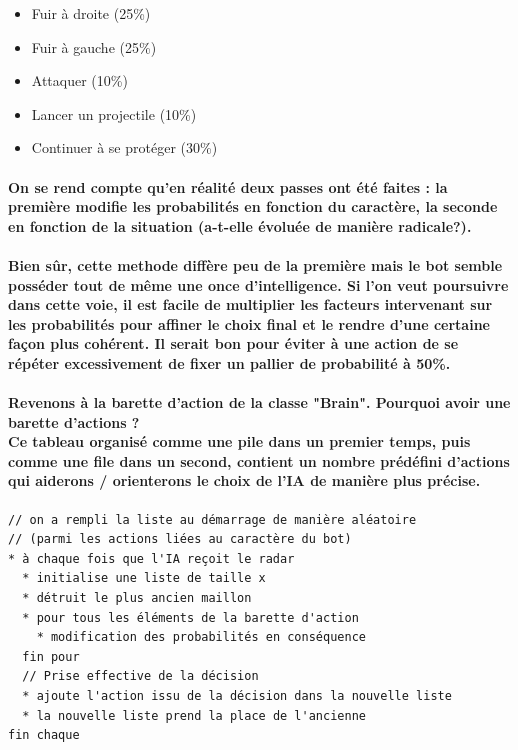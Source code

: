 \begin{itemize}
	\item Fuir à droite (25\%)
	\item Fuir à gauche (25\%)
	\item Attaquer (10\%)
	\item Lancer un projectile (10\%)
	\item Continuer à se protéger (30\%)
\end{itemize}


\paragraph{On se rend compte qu'en réalité deux passes ont été faites : la première modifie les probabilités en fonction du caractère, la seconde en fonction de la situation (a-t-elle évoluée de manière radicale?).}

\paragraph{Bien sûr, cette methode diffère peu de la première mais le bot semble posséder tout de même une once d'intelligence. Si l'on veut poursuivre dans cette voie, il est facile de multiplier les facteurs intervenant sur les probabilités pour affiner le choix final et le rendre d'une certaine façon plus cohérent. Il serait bon pour éviter à une action de se répéter excessivement de fixer un pallier de probabilité à 50\%.}

\paragraph{Revenons à la barette d'action de la classe "Brain". Pourquoi avoir une barette d'actions ?\\
Ce tableau organisé comme une pile dans un premier temps, puis comme une file dans un second, contient un nombre prédéfini d'actions qui aiderons / orienterons le choix de l'IA de manière plus précise.}

\begin{footnotesize}
\begin{verbatim}
// on a rempli la liste au démarrage de manière aléatoire
// (parmi les actions liées au caractère du bot)
* à chaque fois que l'IA reçoit le radar
  * initialise une liste de taille x
  * détruit le plus ancien maillon
  * pour tous les éléments de la barette d'action
    * modification des probabilités en conséquence
  fin pour
  // Prise effective de la décision
  * ajoute l'action issu de la décision dans la nouvelle liste
  * la nouvelle liste prend la place de l'ancienne
fin chaque
\end{verbatim}
\end{footnotesize}


